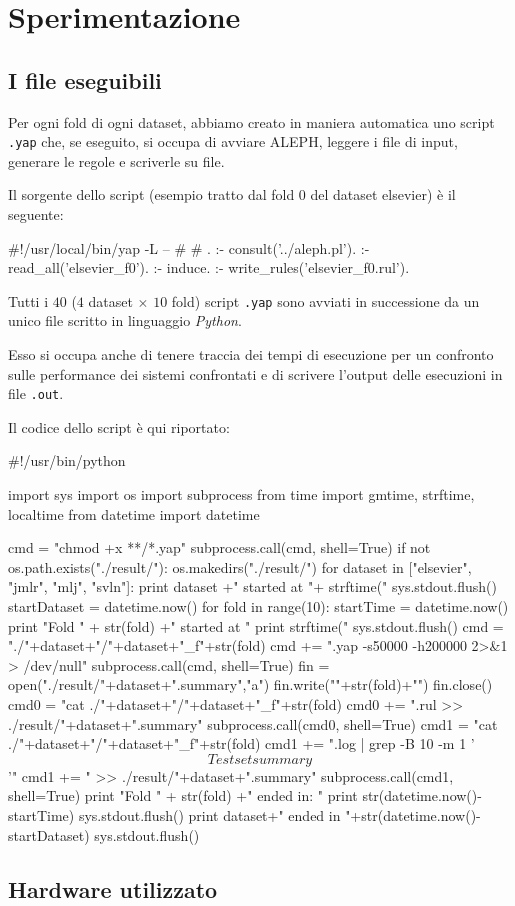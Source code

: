 \section{Sperimentazione}

\subsection{I file eseguibili}
Per ogni fold di ogni dataset, abbiamo creato in maniera automatica uno script \verb+.yap+ che, se eseguito, si occupa di avviare ALEPH, leggere i file di input, generare le regole e scriverle su file.

Il sorgente dello script (esempio tratto dal fold 0 del dataset elsevier) è il seguente:

\begin{prologcode}
#!/usr/local/bin/yap -L --
#
# .
:- consult('../aleph.pl').
:- read_all('elsevier_f0').
:- induce.
:- write_rules('elsevier_f0.rul').
\end{prologcode}

Tutti i $40$ ($4$ dataset $\times$ $10$ fold) script \verb+.yap+ sono avviati in successione da un unico file scritto in linguaggio \emph{Python}.

Esso si occupa anche di tenere traccia dei tempi di esecuzione per un confronto sulle performance dei sistemi confrontati e di scrivere l'output delle esecuzioni in file \verb+.out+.

Il codice dello script è qui riportato:

\begin{pythoncode}
#!/usr/bin/python

import sys
import os
import subprocess
from time import gmtime, strftime, localtime
from datetime import datetime

cmd = "chmod +x **/*.yap"
subprocess.call(cmd, shell=True)
if not os.path.exists("./result/"):
    os.makedirs("./result/")
for dataset in ["elsevier", "jmlr", "mlj", "svln"]:
    print dataset +" started at "+ strftime("%
    sys.stdout.flush()
    startDataset = datetime.now()
    for fold in range(10):
        startTime = datetime.now()
        print "Fold " + str(fold) +" started at "
        print strftime("%
        sys.stdout.flush()
        cmd = "./"+dataset+"/"+dataset+"_f"+str(fold)
        cmd += ".yap -s50000 -h200000 2>&1 > /dev/null"
        subprocess.call(cmd, shell=True)
        fin = open("./result/"+dataset+".summary","a")
        fin.write("\nFold "+str(fold)+"\n")
        fin.close()
        cmd0 = "cat ./"+dataset+"/"+dataset+"_f"+str(fold)
        cmd0 += ".rul >> ./result/"+dataset+".summary"
        subprocess.call(cmd0, shell=True)
        cmd1 = "cat ./"+dataset+"/"+dataset+"_f"+str(fold)
        cmd1 += ".log | grep -B 10 -m 1 '\[Test set summary\]'"
        cmd1 += " >> ./result/"+dataset+".summary"
        subprocess.call(cmd1, shell=True)
        print "Fold " + str(fold) +" ended in: "
        print str(datetime.now()-startTime)
        sys.stdout.flush()
    print dataset+" ended in "+str(datetime.now()-startDataset)
    sys.stdout.flush()
\end{pythoncode}


\subsection{Hardware utilizzato}